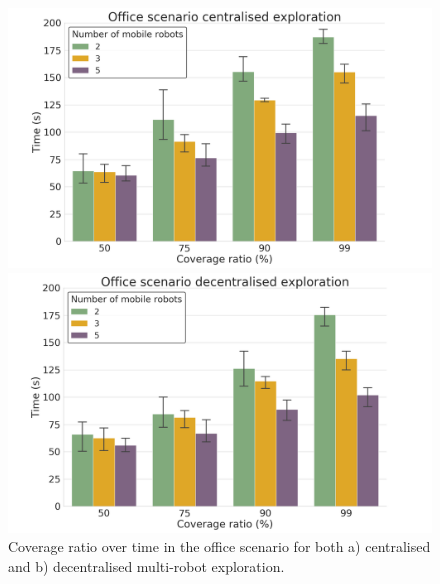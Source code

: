 \documentclass[letterpaper, 10 pt, conference]{ieeeconf}  %
\begin{document}
\begin{figure}[!h]
	\centering
	\begin{minipage}[c]{0.5\textwidth}
		\centering
		\includegraphics[width=\textwidth]{office_c_cent.png}
		\captionsetup{labelformat=empty}
		\caption*{}
		\label{fig:office1}
	\end{minipage}%
	\begin{minipage}[c]{0.50\textwidth}
		\centering
		\includegraphics[width=\textwidth]{office_c_decent.png}
		\captionsetup{labelformat=empty}
		\caption*{}
		\label{fig:office2}
	\end{minipage}
 \caption{Coverage ratio over time in the office scenario for both a) centralised and b) decentralised multi-robot exploration.}
 \label{fig:office_coverage}
\end{figure}
\end{document}
